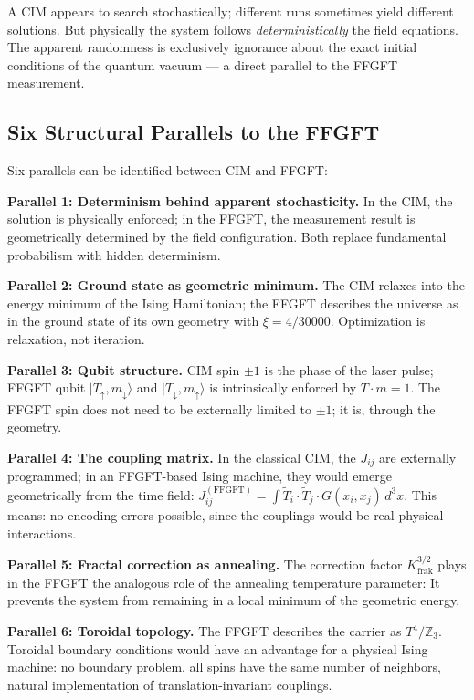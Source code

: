A CIM appears to search stochastically; different runs sometimes yield
different solutions. But physically the system follows
\emph{deterministically} the field equations. The apparent randomness
is exclusively ignorance about the exact initial conditions of the
quantum vacuum --- a direct parallel to the FFGFT measurement.

\subsection*{Six Structural Parallels to the FFGFT}

Six parallels can be identified between CIM and FFGFT:

\textbf{Parallel 1: Determinism behind apparent stochasticity.} In
the CIM, the solution is physically enforced; in the FFGFT, the
measurement result is geometrically determined by the field configuration. Both
replace fundamental probabilism with hidden determinism.

\textbf{Parallel 2: Ground state as geometric minimum.} The CIM
relaxes into the energy minimum of the Ising Hamiltonian; the FFGFT
describes the universe as in the ground state of its own geometry
with $\xi = 4/30000$. Optimization is relaxation, not iteration.

\textbf{Parallel 3: Qubit structure.} CIM spin $\pm1$ is the phase
of the laser pulse; FFGFT qubit $|\tilde T_\uparrow,m_\downarrow\rangle$
and $|\tilde T_\downarrow,m_\uparrow\rangle$ is intrinsically enforced by $\tilde T\cdot m = 1$.
The FFGFT spin does not need to be externally limited to $\pm1$;
it is, through the geometry.

\textbf{Parallel 4: The coupling matrix.} In the classical CIM, the
$J_{ij}$ are externally programmed; in an FFGFT-based Ising machine,
they would emerge geometrically from the time field:
$J_{ij}^{(\mathrm{FFGFT})} = \int\tilde T_i\cdot\tilde T_j\cdot G(x_i,x_j)\,d^3x$.
This means: no encoding errors possible, since the couplings would be real
physical interactions.

\textbf{Parallel 5: Fractal correction as annealing.} The correction factor
$K_{\mathrm{frak}}^{3/2}$ plays in the FFGFT the analogous role of the
annealing temperature parameter: It prevents the system from remaining in a
local minimum of the geometric energy.

\textbf{Parallel 6: Toroidal topology.} The FFGFT describes the
carrier as $T^4/\mathbb{Z}_3$. Toroidal boundary conditions would have
an advantage for a physical Ising machine: no boundary problem, all
spins have the same number of neighbors, natural implementation of
translation-invariant couplings.

